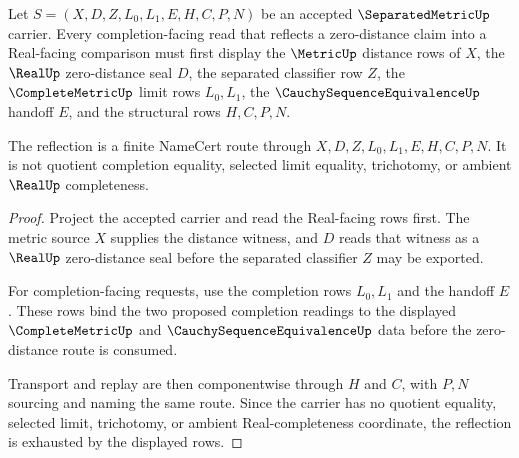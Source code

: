 \begin{theorem}
\label{thm:separatedmetric-zero-distance-real-reflection}
Let $S=(X,D,Z,L_0,L_1,E,H,C,P,N)$ be an accepted $\SeparatedMetricUp$ carrier. Every completion-facing read that reflects a zero-distance claim into a Real-facing comparison must first display the $\MetricUp$ distance rows of $X$, the $\RealUp$ zero-distance seal $D$, the separated classifier row $Z$, the $\CompleteMetricUp$ limit rows $L_0,L_1$, the $\CauchySequenceEquivalenceUp$ handoff $E$, and the structural rows $H,C,P,N$.

The reflection is a finite NameCert route through $X,D,Z,L_0,L_1,E,H,C,P,N$. It is not quotient completion equality, selected limit equality, trichotomy, or ambient $\RealUp$ completeness.
\end{theorem}
\begin{proof}
Project the accepted carrier and read the Real-facing rows first. The metric source $X$ supplies the distance witness, and $D$ reads that witness as a $\RealUp$ zero-distance seal before the separated classifier $Z$ may be exported.

For completion-facing requests, use the completion rows $L_0,L_1$ and the handoff $E$. These rows bind the two proposed completion readings to the displayed $\CompleteMetricUp$ and $\CauchySequenceEquivalenceUp$ data before the zero-distance route is consumed.

Transport and replay are then componentwise through $H$ and $C$, with $P,N$ sourcing and naming the same route. Since the carrier has no quotient equality, selected limit, trichotomy, or ambient Real-completeness coordinate, the reflection is exhausted by the displayed rows.
\end{proof}

